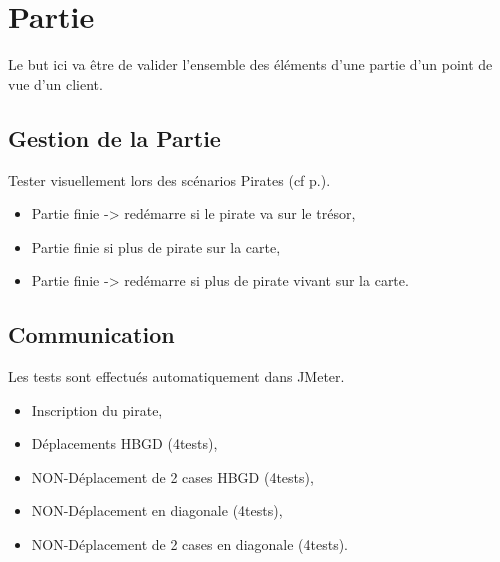 %

\section{Partie}
\label{sec:partie}
Le but ici va être de valider l’ensemble des éléments d'une partie d'un point de vue d'un client.

\subsection{Gestion de la Partie}
\label{subsec:partieGestion}

Tester visuellement lors des scénarios Pirates (cf p.\pageref{subsec:piratesDeplacements}).\\
\begin{itemize}
\item Partie finie -> redémarre si le pirate va sur le trésor,
\item Partie finie si plus de pirate sur la carte,
\item Partie finie -> redémarre si plus de pirate vivant sur la carte.
\end{itemize}

\subsection{Communication}
\label{subsec:partieCommunication}
Les tests sont effectués automatiquement dans JMeter.
\begin{itemize}
\item Inscription du pirate,
\item Déplacements HBGD (4tests),
\item NON-Déplacement de 2 cases HBGD (4tests),
\item NON-Déplacement en diagonale (4tests),
\item NON-Déplacement de 2 cases en diagonale (4tests).
\end{itemize}